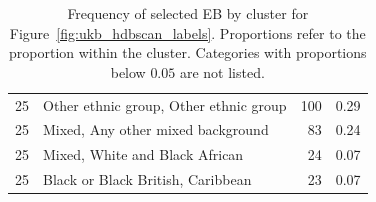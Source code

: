 \begin{table}[ht]
{\begin{tabular}[t]{rlrr}
   25 & Other ethnic group, Other ethnic group & 100 & 0.29 \\ 
   25 & Mixed, Any other mixed background &  83 & 0.24 \\ 
   25 & Mixed, White and Black African &  24 & 0.07 \\ 
   25 & Black or Black British, Caribbean &  23 & 0.07 \\ 
   \hline
\end{tabular}
}
\caption[Frequency of selected EB by cluster]{Frequency of selected EB by cluster for Figure~\ref{fig:ukb_hdbscan_labels}. Proportions refer to the proportion within the cluster. Categories with proportions below $0.05$ are not listed.}
\label{table:supp_ukb_cluster_sieb} 
\end{table} 

\clearpage

